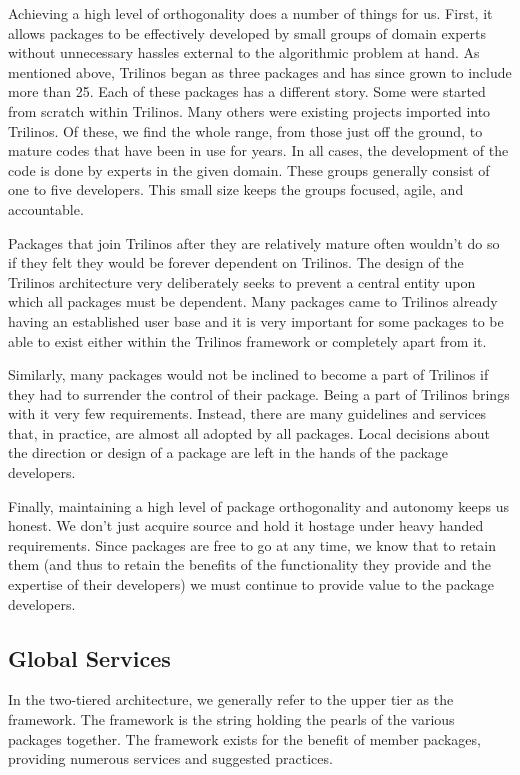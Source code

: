\documentclass[12pt,relax]{article}
\begin{document}
Achieving a high level of orthogonality does a number of things for us.  First,
it allows packages to be effectively developed by small groups of domain
experts without unnecessary hassles external to the algorithmic problem at
hand.  As mentioned above, Trilinos began as three packages and has since
grown to include more than 25.  Each of these packages has a different story.  
Some were started from scratch within Trilinos.  Many others were existing
projects imported into Trilinos.  Of these, we find the whole range, from
those just off the ground, to mature codes that have been in use for years.
In all cases, the development of the code is done by experts in the given
domain.  These groups generally consist of one to five developers.  This
small size keeps the groups focused, agile, and accountable.
  
Packages that join Trilinos after they are relatively mature often wouldn't
do so if they felt they would be forever dependent on Trilinos.  The design
of the Trilinos architecture very deliberately seeks to prevent a central
entity upon which all packages must be dependent.  Many packages came to 
Trilinos already having an established user base and it is very important
for some packages to be able to exist either within the Trilinos framework
or completely apart from it.

Similarly, many packages would not be inclined to become a part of Trilinos
if they had to surrender the control of their package.  Being a part of
Trilinos brings with it very few requirements.  Instead, there are many
guidelines and services that, in practice, are almost all adopted by all
packages.  Local decisions about the direction or design of a package are
left in the hands of the package developers.

Finally, maintaining a high level of package orthogonality and autonomy
keeps us honest.  We don't just acquire source and hold it hostage under heavy
handed requirements.  Since packages are free to go at any time, we know that
to retain them (and thus to retain the benefits of the functionality they
provide and the expertise of their developers) we must continue to provide
value to the package developers.

\subsection{Global Services}

In the two-tiered architecture, we generally refer to the upper tier as the
framework.  The framework is the string holding the pearls of the various
packages together.  The framework exists for the benefit of member
packages, providing numerous services and suggested practices.
\end{document}
